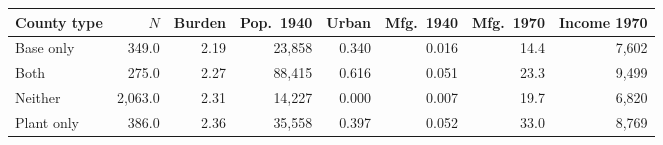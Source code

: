 \begin{tabular}{lrrrrrrr}
\toprule
County type & $N$ & Burden & Pop.\ 1940 & Urban & Mfg.\ 1940 & Mfg.\ 1970 & Income 1970 \\
\midrule
Base only & 349.0 & 2.19 & 23,858 & 0.340 & 0.016 & 14.4 & 7,602 \\
Both & 275.0 & 2.27 & 88,415 & 0.616 & 0.051 & 23.3 & 9,499 \\
Neither & 2,063.0 & 2.31 & 14,227 & 0.000 & 0.007 & 19.7 & 6,820 \\
Plant only & 386.0 & 2.36 & 35,558 & 0.397 & 0.052 & 33.0 & 8,769 \\
\bottomrule
\end{tabular}